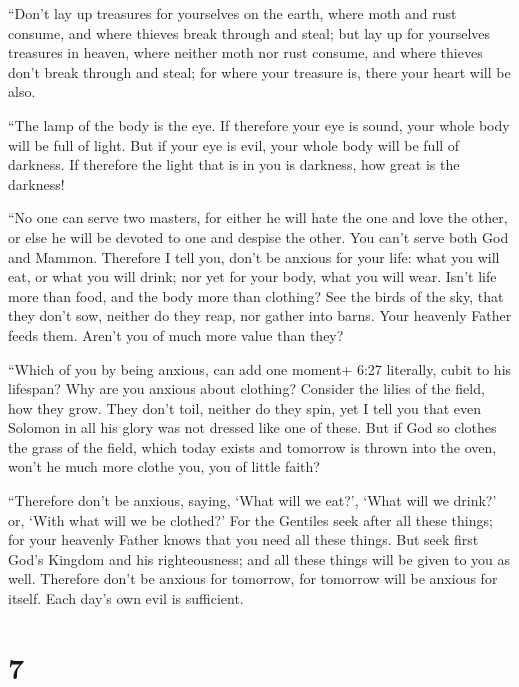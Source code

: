  ``Don't lay up treasures for yourselves on the earth,
where moth and rust consume, and where thieves break through and steal;
 but lay up for yourselves treasures in heaven, where
neither moth nor rust consume, and where thieves don't break through and
steal;  for where your treasure is, there your heart will
be also.

 ``The lamp of the body is the eye. If therefore your eye
is sound, your whole body will be full of light.  But if
your eye is evil, your whole body will be full of darkness. If therefore
the light that is in you is darkness, how great is the darkness!

 ``No one can serve two masters, for either he will hate
the one and love the other, or else he will be devoted to one and
despise the other. You can't serve both God and Mammon. 
Therefore I tell you, don't be anxious for your life: what you will eat,
or what you will drink; nor yet for your body, what you will wear. Isn't
life more than food, and the body more than clothing?  See
the birds of the sky, that they don't sow, neither do they reap, nor
gather into barns. Your heavenly Father feeds them. Aren't you of much
more value than they?

 ``Which of you by being anxious, can add one moment+ 6:27
literally, cubit to his lifespan?  Why are you anxious
about clothing? Consider the lilies of the field, how they grow. They
don't toil, neither do they spin,  yet I tell you that even
Solomon in all his glory was not dressed like one of these.
 But if God so clothes the grass of the field, which today
exists and tomorrow is thrown into the oven, won't he much more clothe
you, you of little faith?

 ``Therefore don't be anxious, saying, `What will we eat?',
`What will we drink?' or, `With what will we be clothed?' 
For the Gentiles seek after all these things; for your heavenly Father
knows that you need all these things.  But seek first God's
Kingdom and his righteousness; and all these things will be given to you
as well.  Therefore don't be anxious for tomorrow, for
tomorrow will be anxious for itself. Each day's own evil is sufficient.

\hypertarget{section-6}{%
\section{7}\label{section-6}}

